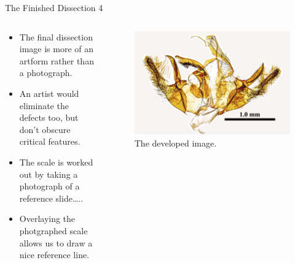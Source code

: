 \documentclass[
  ignorenonframetext,
]{beamer}
\providecommand{\tightlist}{%
  \setlength{\itemsep}{0pt}\setlength{\parskip}{0pt}}
\begin{document}
\begin{frame}{The Finished Dissection 4}
\protect\hypertarget{the-finished-dissection-4}{}
\begin{columns}[T]
\begin{column}{0.5\textwidth}
\begin{itemize}
\tightlist
\item
  The final dissection image is more of an artform rather than a
  photograph.
\item
  An artist would eliminate the defects too, but don't obscure critical
  features.
\item
  The scale is worked out by taking a photograph of a reference
  slide\ldots..
\item
  Overlaying the photgraphed scale allows us to draw a nice reference
  line.
\end{itemize}
\end{column}

\begin{column}{0.5\textwidth}
\begin{figure}
\centering
\includegraphics{./images/PJP20220218-001-developed-dissection.jpg}
\caption{The developed image.}
\end{figure}
\end{column}
\end{columns}
\end{frame}
\end{document}
